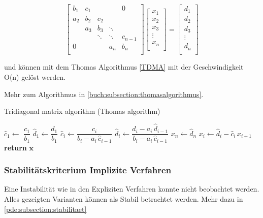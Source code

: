  \begin{equation}
    \begin{bmatrix}{b_{1}}&{c_{1}}&{}&{}&{0}\\
      {a_{2}}&{b_{2}}&{c_{2}}&{}&{}\\
      {}&{a_{3}}&{b_{3}}&\ddots &{}\\
      {}&{}&\ddots &\ddots &{c_{n-1}}\\
      {0}&{}&{}&{a_{n}}&{b_{n}}\\
      \end{bmatrix}
      \begin{bmatrix}{x_{1}}\\
      {x_{2}}\\{x_{3}}\\\vdots \\
      {x_{n}}\\
      \end{bmatrix}
      =
      \begin{bmatrix}{d_{1}}\\
      {d_{2}}\\{d_{3}}\\
      \vdots \\{d_{n}}\\
    \end{bmatrix}
  \end{equation}
  
   und k\"onnen mit dem Thomas Algorithmus \ref{TDMA} mit der Geschwindigkeit O(n) gel\"ost werden.
  
   Mehr zum Algorithmus in \ref{buch:subsection:thomasalgorithmus}.


\begin{algorithm}\caption{Tridiagonal matrix algorithm (Thomas algorithm)}\label{TDMA}
  \setlength{\lineskip}{7pt}
  \begin{algorithmic}[1]
      \State $\hat c_1 \gets$ $ \dfrac{c_1}{b_1}$
      \State $\hat d_1 \gets \dfrac{d_1}{b_1}$
        \State $\hat c_i \gets \dfrac{c_i}{b_i-a_i \, \hat c_{i-1}}$
        \State $\hat d_i \gets \dfrac{d_i - a_i \, \hat d_{i-1}}{b_i-a_i \, \hat c_{i-1}}$
      \EndFor
      \State $x_n \gets \hat d_n$
        \State $x_i \gets \hat d_i - \hat c_i \, x_{i+1}$
      \EndFor
      \State \textbf{return} $\textbf{x}$
    \EndFunction
  \end{algorithmic}
\end{algorithm}

\subsubsection{Stabilit\"atskriterium Implizite Verfahren}

Eine Instabilit\"at wie in den Expliziten Verfahren konnte nicht beobachtet werden.
Alles gezeigten Varianten k\"onnen als Stabil betrachtet werden.
Mehr dazu in \ref{pde:subsection:stabilitaet}
